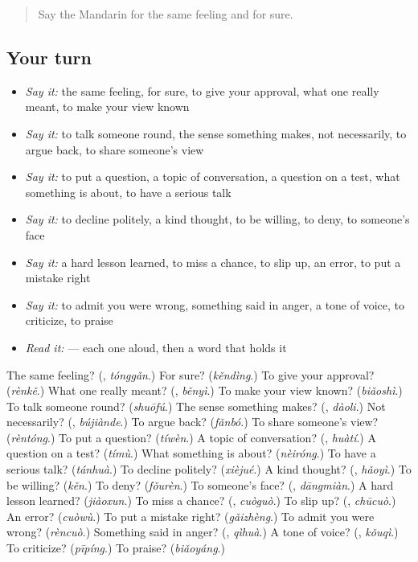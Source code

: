 \label{lesson:ZH-R357-review-352-357}



\begin{quote}
Say the Mandarin for the same feeling and for sure.
\end{quote}

\subsection*{Your turn}
\begin{itemize}
\raggedright
  \item \emph{Say it:} the same feeling, for sure, to give your approval, what one really meant, to make your view known
  \item \emph{Say it:} to talk someone round, the sense something makes, not necessarily, to argue back, to share someone's view
  \item \emph{Say it:} to put a question, a topic of conversation, a question on a test, what something is about, to have a serious talk
  \item \emph{Say it:} to decline politely, a kind thought, to be willing, to deny, to someone's face
  \item \emph{Say it:} a hard lesson learned, to miss a chance, to slip up, an error, to put a mistake right
  \item \emph{Say it:} to admit you were wrong, something said in anger, a tone of voice, to criticize, to praise
  \item \emph{Read it:}    — each one aloud, then a word that holds it
\end{itemize}

\begin{tcolorbox}[breakable,colback=teal!4,colframe=teal!35!black,title={Before you move on}]
The same feeling? (\textbf{}, \emph{tónggǎn}.) For sure? (\emph{kěndìng}.) To give your approval? (\emph{rènkě}.) What one really meant? (\textbf{}, \emph{běnyì}.) To make your view known? (\emph{biǎoshì}.) To talk someone round? (\emph{shuōfú}.) The sense something makes? (\textbf{}, \emph{dàoli}.) Not necessarily? (\textbf{}, \emph{bújiànde}.) To argue back? (\emph{fǎnbó}.) To share someone's view? (\emph{rèntóng}.) To put a question? (\emph{tíwèn}.) A topic of conversation? (\textbf{}, \emph{huàtí}.) A question on a test? (\emph{tímù}.) What something is about? (\emph{nèiróng}.) To have a serious talk? (\emph{tánhuà}.) To decline politely? (\emph{xièjué}.) A kind thought? (\textbf{}, \emph{hǎoyì}.) To be willing? (\emph{kěn}.) To deny? (\emph{fǒurèn}.) To someone's face? (\textbf{}, \emph{dāngmiàn}.) A hard lesson learned? (\emph{jiàoxun}.) To miss a chance? (\textbf{}, \emph{cuòguò}.) To slip up? (\textbf{}, \emph{chūcuò}.) An error? (\emph{cuòwù}.) To put a mistake right? (\emph{gǎizhèng}.) To admit you were wrong? (\emph{rèncuò}.) Something said in anger? (\textbf{}, \emph{qìhuà}.) A tone of voice? (\textbf{}, \emph{kǒuqì}.) To criticize? (\emph{pīpíng}.) To praise? (\emph{biǎoyáng}.)
\end{tcolorbox}
